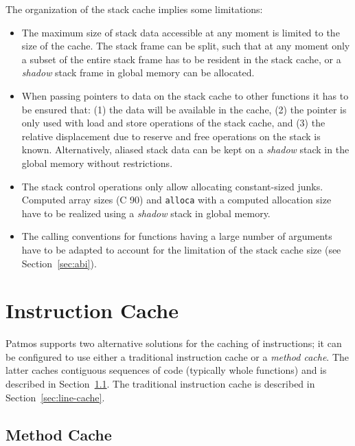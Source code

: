 \documentclass[a4paper,fontsize=10pt,twoside,DIV15,BCOR12mm,headinclude=true,footinclude=false,pagesize,bibtotoc]{scrbook}
\begin{document}
The organization of the stack cache implies some limitations:
\begin{itemize}
  \item The maximum size of stack data accessible at any moment is limited to
        the size of the cache. The stack frame can be split, such that at any
        moment only a subset of the entire stack frame has to be resident in the
        stack cache, or a \emph{shadow} stack frame in global memory can be
        allocated.
  \item When passing pointers to data on the stack cache to other functions it
        has to be ensured that: (1) the data will be available in the cache, (2)
        the pointer is only used  with load and store operations of the stack
        cache, and (3) the relative displacement due to reserve and free
        operations on the stack is known. Alternatively, aliased stack data can
        be kept on a \emph{shadow} stack in the global memory without
        restrictions.
  \item The stack control operations only allow allocating constant-sized junks.
        Computed array sizes (C 90) and \texttt{alloca} with a computed
        allocation size have to be realized using a \emph{shadow} stack in
        global memory.
  \item The calling conventions for functions having a large number of arguments
        have to be adapted to account for the limitation of the stack cache
        size (see Section~\ref{sec:abi}).
\end{itemize}



\section{Instruction Cache}

Patmos supports two alternative solutions for the caching of
instructions; it can be configured to use either a traditional
instruction cache or a \emph{method cache}. The latter caches
contiguous sequences of code (typically whole functions) and is
described in Section~\ref{sec:method-cache}. The traditional
instruction cache is described in Section~\ref{sec:line-cache}.

\subsection{Method Cache}
\label{sec:method-cache}
\end{document}
